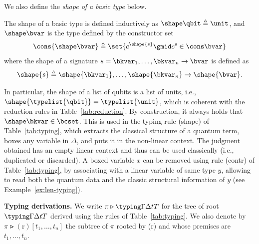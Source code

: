 We also define the \emph{shape of a basic type} below.
\begin{definition}
  \label{def:shape-type}
  The shape of a basic type is defined inductively as $\shape \qbit \triangleq
  \unit$, and $\shape \bvar $ is the type defined by the constructor set  
  \[
    \cons{\shape \bvar} \triangleq \set{
      c^{\shape{s}}
      \gmid c^{s} \in \cons \bvar
    }
  \]
  where the shape of a signature $s=\bkvar_1,\ldots,\bkvar_n \to \bvar$ is defined as 
  \[
  \shape{s} \triangleq \shape{\bkvar_1},\ldots,\shape{\bkvar_n} \to \shape{\bvar}.
  \]
\end{definition}
In particular, the shape of a list of qubits is a list of units, i.e.,
$\shape{\typelist{\qbit}} = \typelist{\unit}$, which is coherent with the
reduction rules in Table~\ref{tab:reduction}. By construction, it always holds
that $\shape \bkvar \in \bcset$. This is used in the typing rule (shape) of
Table~\ref{tab:typing}, which extracts the classical structure of a quantum
term, boxes any variable in $\Delta$, and puts it in the non-linear context.
The judgment obtained has an empty linear context and thus can be used
classically (i.e., duplicated or discarded). A boxed variable $x$ can be
removed using rule (contr) of Table~\ref{tab:typing}, by associating with a
linear variable of same type $y$, allowing to read both the quantum data and
the classic structural information of $y$ (see Example~\ref{ex:len-typing}).


\medskip
\noindent
\textbf{Typing derivations. }
We write $\pi \triangleright \typing \Gamma \Delta t T$ for the tree of root
$\typing \Gamma \Delta t T$ derived using the rules of Table~\ref{tab:typing}.
We also denote by $\pi \rightslice \mathrm{(r)}[t_1, \dots, t_n]$ the subtree
of $\pi$ rooted by (r) and whose premises are $t_1, \dots, t_n$.

